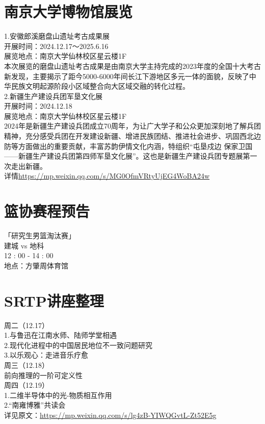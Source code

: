 \documentclass[letterpaper, 12pt]{article}
\begin{document}
\begin{multicols}{2}
\section{南京大学博物馆展览}
1.安徽郎溪磨盘山遗址考古成果展\\
开展时间：2024.12.17～2025.6.16\\
展览地点：南京大学仙林校区星云楼1F\\
本次展览的磨盘山遗址考古成果是由南京大学主持完成的2023年度的全国十大考古新发现，主要揭示了距今5000-6000年间长江下游地区多元一体的面貌，反映了中华民族文明起源阶段小区域整合向大区域交融的转化过程。\\
2.新疆生产建设兵团军垦文化展\\
开展时间：2024.12.18\\
展览地点：南京大学仙林校区星云楼1F\\
2024年是新疆生产建设兵团成立70周年，为让广大学子和公众更加深刻地了解兵团精神，充分感受兵团在开发建设新疆、增进民族团结、推进社会进步、巩固西北边防等方面做出的重要贡献，丰富苏韵伊情文化内涵，特组织“屯垦戍边 保家卫国——新疆生产建设兵团第四师军垦文化展”。这也是新疆生产建设兵团专题展第一次走出新疆。\\
详情\url{https://mp.weixin.qq.com/s/MG0OfmVRtyUjEG4WoBA24w}\\

\section{篮协赛程预告}
「研究生男篮淘汰赛」\\
建城 vs 地科\\
12 : 00 - 14 : 00\\
地点：方肇周体育馆\\

\section{SRTP讲座整理}
周二（12.17）\\
1.与鲁迅在江南水师、陆师学堂相遇\\
2.现代化进程中的中国居民地位不一致问题研究\\
3.以乐观心：走进音乐疗愈\\
周三（12.18）\\
前向推理的一阶可定义性\\
周四（12.19）\\
1.二维半导体中的光-物质相互作用\\
2.“南雍博雅”共读会\\
详见原文：\url{https://mp.weixin.qq.com/s/lg4zB-YIWQGvtL-Zt52E5g}



\end{multicols}
\end{document}
